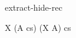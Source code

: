 \begin{circuslaw}{extract-hide-rec}
\begin{circusaction*}
  \circmu X \circspot (A \circhide cs) \; \equiv \; (\circmu X \circspot A) \circhide cs
\end{circusaction*}
\end{circuslaw}
